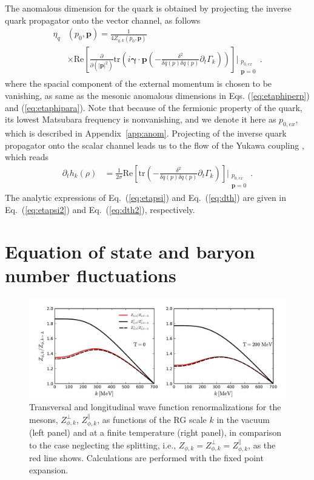 \documentclass[%
reprint,
superscriptaddress,
showpacs,preprintnumbers,
 amsmath,amssymb,
 aps,
prd,
]{revtex4-1}
\def\Eq#1{Eq.~(\ref{#1})}
\def\app#1{Appendix~\ref{#1}}
\begin{document}
The anomalous dimension for the quark is obtained by projecting the inverse quark propagator onto the vector channel, as follows
\begin{align}
  \eta_{q}&(p_0,\bm{p})=\frac{1}{4 Z_{q,k}(p_0,\bm{p})}\nonumber \\[2ex]
          &\times\mathrm{Re}\left[\frac{\partial}{\partial (|\bm{p}|^2)}\mathrm{tr}
            \left(i \bm{\gamma}\cdot\bm{p}\left(-\frac{\delta^2}{\delta\bar{q}(p)
            \delta q(p)}\partial_t \Gamma_k\right)\right)\right]\Bigg|_{\substack{p_{0,ex}\\ \bm{p}=0}}\,.   \label{eq:etapsi}
\end{align}
where the spacial component of the external momentum is chosen to be vanishing, as same as the mesonic anomalous dimensions in Eqs. (\ref{eq:etaphiperp}) and (\ref{eq:etaphipara}). Note that because of the fermionic property of the quark, its lowest Matsubara frequency is nonvanishing, and we denote it here as $p_{0,ex}$, which is described in \app{app:anom}.  Projecting of the inverse quark propagator onto the scalar channel leads us to the flow of the Yukawa coupling \cite{Pawlowski:2014zaa}, which reads
\begin{align}
  \partial_t h_k(\rho)&=\frac{1}{2 \sigma}\mathrm{Re}\left[\mathrm{tr}\left(-\frac{\delta^2}{\delta\bar{q}(p)
            \delta q(p)}\partial_t \Gamma_k\right)\right]\Bigg|_{\substack{p_{0,ex}\\ \bm{p}=0}}\,.  \label{eq:dth}
\end{align}
The analytic expressions of \Eq{eq:etapsi} and \Eq{eq:dth} are given in \Eq{eq:etapsi2} and \Eq{eq:dth2}, respectively.



\section{Equation of state and baryon number fluctuations}
\label{sec:EoS}

%
\begin{figure}[t]
\includegraphics[width=1\textwidth]{zphi}
\caption{Transversal and longitudinal wave function renormalizations for the mesons, $Z_{\phi,k}^{\perp}$, $Z_{\phi,k}^{\parallel}$, as functions of the RG scale $k$ in the vacuum (left panel) and at a finite temperature (right panel), in comparison to the case neglecting the splitting, i.e., $Z_{\phi,k}=Z_{\phi,k}^{\perp}=Z_{\phi,k}^{\parallel}$, as the red line shows. Calculations are performed with the fixed point expansion.}\label{fig:zphi}
\end{figure}
%
\end{document}
